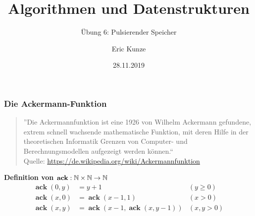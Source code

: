\documentclass{beamer}
\DeclareMathOperator{\ack}{\mathbf{ack}}
\begin{document}
	
	\title{Algorithmen und Datenstrukturen}
	\subtitle{Übung 6: Pulsierender Speicher}
	\author{Eric Kunze}
	\date{28.11.2019}

	\maketitle



\begin{frame} \frametitle{Die Ackermann-Funktion}
	\begin{quote} \small
		''Die Ackermannfunktion ist eine 1926 von Wilhelm Ackermann gefundene, extrem schnell wachsende mathematische Funktion, mit deren Hilfe in der theoretischen Informatik Grenzen von Computer- und Berechnungsmodellen aufgezeigt werden können.`` \\
		\upshape \tiny Quelle: \url{https://de.wikipedia.org/wiki/Ackermannfunktion}
	\end{quote}

	\textbf{Definition von  $\ack : \N \times \N \to \N$}
	\begin{align*}
		\ack(0,y) &= y + 1 &(y \ge 0) \\
		\ack(x,0) &= \ack(x-1,1) &(x > 0)\\
		\ack(x,y) &= \ack(x-1,\ack(x,y-1)) &(x,y > 0)
	\end{align*}
\end{frame}
\end{document}
